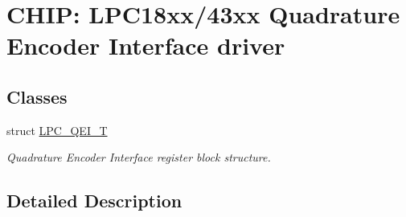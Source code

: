 \hypertarget{group___q_e_i__18_x_x__43_x_x}{}\section{C\+H\+IP\+: L\+P\+C18xx/43xx Quadrature Encoder Interface driver}
\label{group___q_e_i__18_x_x__43_x_x}
\subsection*{Classes}
\begin{DoxyCompactItemize}
\item 
struct \hyperlink{struct_l_p_c___q_e_i___t}{L\+P\+C\+\_\+\+Q\+E\+I\+\_\+T}
\begin{DoxyCompactList}\small\item\em Quadrature Encoder Interface register block structure. \end{DoxyCompactList}\end{DoxyCompactItemize}


\subsection{Detailed Description}
